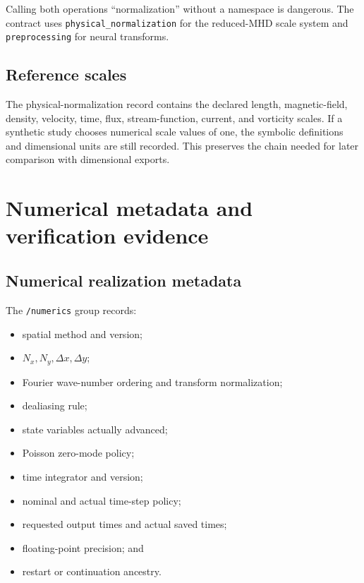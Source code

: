 \documentclass[11pt]{article}
\newcommand{\dataset}[1]{\texttt{/#1}}
\newcommand{\code}[1]{\texttt{#1}}
\begin{document}
\begin{warningbox}
Calling both operations ``normalization'' without a namespace is dangerous. The contract uses \code{physical\_normalization} for the reduced-MHD scale system and \code{preprocessing} for neural transforms.
\end{warningbox}

\subsection{Reference scales}

The physical-normalization record contains the declared length, magnetic-field, density, velocity, time, flux, stream-function, current, and vorticity scales. If a synthetic study chooses numerical scale values of one, the symbolic definitions and dimensional units are still recorded. This preserves the chain needed for later comparison with dimensional exports.

\section{Numerical metadata and verification evidence}
\label{sec:numerics}

\subsection{Numerical realization metadata}

The \dataset{numerics} group records:
\begin{itemize}
  \item spatial method and version;
  \item $N_x,N_y,\Delta x,\Delta y$;
  \item Fourier wave-number ordering and transform normalization;
  \item dealiasing rule;
  \item state variables actually advanced;
  \item Poisson zero-mode policy;
  \item time integrator and version;
  \item nominal and actual time-step policy;
  \item requested output times and actual saved times;
  \item floating-point precision; and
  \item restart or continuation ancestry.
\end{itemize}
\end{document}
